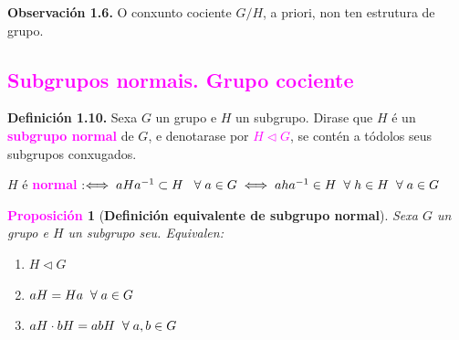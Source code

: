 \documentclass[twoside]{report}
\newcommand{\magbf}[1]{\textcolor{magenta}{\textbf{#1}}} %
\theoremstyle{mystyle}
\newtheorem{prop}{\magbf{Proposición}}[chapter]
\newenvironment{proposition}
{\begin{mdframed}[linecolor = magenta,backgroundcolor = classicrose, linewidth = 2mm]\begin{prop}}
{\end{prop}\end{mdframed}}
\begin{document}
\hspace{3mm}

\noindent \textbf{Observación 1.6.} O conxunto cociente $G/H$, a priori, non ten estrutura de grupo.

\textcolor{magenta}{\subsection{Subgrupos normais. Grupo cociente}}

\vspace{3mm}

\noindent \textbf{Definición 1.10.} Sexa $G$ un grupo e $H$ un subgrupo. Dirase que $H$ é un \textcolor{magenta}{\textbf{subgrupo normal}} de $G$, e denotarase por \textcolor{magenta}{$H \triangleleft G$}, se contén a tódolos seus subgrupos conxugados.

\hspace{2MM}

\begin{center}
    $H$ é \textcolor{magenta}{\textbf{normal}} \hspace{1MM} :$\Longleftrightarrow \hspace{1Mm} aHa^{-1} \subset H \hspace{3MM} \forall \hspace{1mm} a \in G \hspace{1mm} \Longleftrightarrow \hspace{1mm} aha^{-1} \in H \hspace{2MM} \forall \hspace{1Mm} h \in H \hspace{2MM} \forall \hspace{1mm} a \in G$
\end{center}

\hspace{2mm}

\begin{proposition}[\textbf{Definición equivalente de subgrupo normal}] \label{prop1.4}
Sexa $G$ un grupo e $H$ un subgrupo seu. Equivalen:
\begin{enumerate}
    \item $H \triangleleft G$
    \item $aH = Ha \hspace{2mm} \forall \hspace{1mm} a \in G$
    \item $aH \cdot bH = abH \hspace{2MM} \forall \hspace{1MM} a,b \in G$
\end{enumerate}
\end{proposition}
\end{document}
